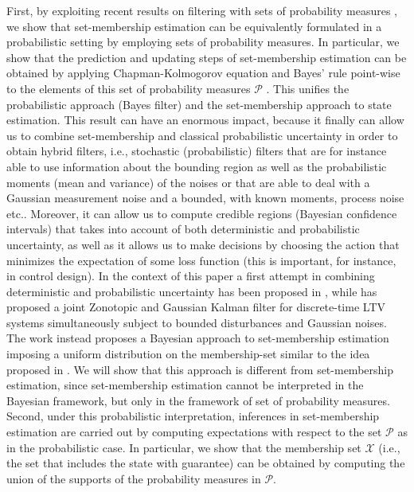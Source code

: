 \documentclass[twocolumn]{autart}
\newcommand{\DP}[1]{{#1}}
\begin{document}
First, by exploiting recent results on filtering with sets of probability measures  
\cite{benavoli2013b,benavoli_2010_journal_b}, we show that set-membership estimation can  be equivalently formulated in 
a probabilistic setting by employing sets of probability measures. In particular, we show that the prediction and 
updating steps of set-membership estimation can be obtained by applying Chapman-Kolmogorov equation and Bayes' rule 
point-wise to the elements of this set of probability measures  $\mathcal{P}$ . This unifies the probabilistic approach 
(Bayes filter) and the set-membership approach to state estimation. {This result can have an enormous impact, because it 
finally can allow us to combine set-membership and classical probabilistic uncertainty in order to obtain hybrid 
filters, i.e., stochastic (probabilistic) filters that are for instance able to use information about the bounding 
region as well as the probabilistic moments (mean and variance) of the noises or that are able to deal with a Gaussian 
measurement noise and a bounded, with known moments, process noise etc..  {Moreover, it can allow us to compute credible
regions (Bayesian confidence intervals)  that takes into account of both deterministic and probabilistic uncertainty, as 
well as it allows us to  make decisions by choosing the action that minimizes the expectation of some loss function 
(this is important, for instance, in control design). 
{ In the context of this paper a first attempt in combining deterministic and probabilistic uncertainty has been 
proposed in \cite{benavoli2013b}, while \cite{Combastel2015289}
has proposed a joint Zonotopic and Gaussian Kalman filter  for discrete-time LTV systems simultaneously subject to bounded disturbances and Gaussian noises.
The work  \cite{Canti6693825} instead proposes a Bayesian approach to set-membership estimation imposing a uniform distribution on
the membership-set similar to the idea proposed in \cite{Gning2010,Gning2011}. We will show that this approach is different from set-membership estimation, since set-membership estimation cannot be interpreted in the Bayesian framework, but only
in the framework of set of probability measures.}}}\\
Second, under this probabilistic interpretation, inferences in set-membership estimation  are carried out by computing expectations \DP{with respect to}  the
set $\mathcal{P}$ as in the probabilistic case. In particular, we show that the membership set $\mathcal{X}$ (i.e., the set that includes the state with guarantee)  can be obtained by computing the union of the supports of the probability measures in $\mathcal{P}$.
\end{document}
